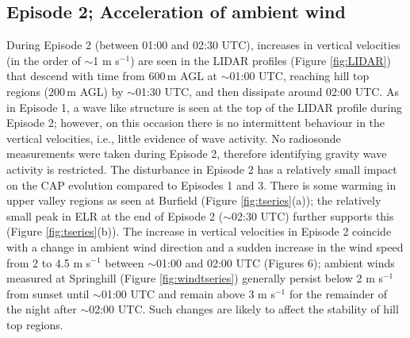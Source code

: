 \documentclass[times]{qjrms4}
\begin{document}
\subsection{Episode 2; Acceleration of ambient wind}
\label{ep2}
During Episode 2 (between 01:00 and 02:30 UTC), increases in vertical velocities (in the order of $\sim$1 m s$^{−1}$) are seen in the LIDAR profiles (Figure \ref{fig:LIDAR}) that descend with time from 600$\,\mbox{m}$ AGL at $\sim$01:00 UTC, reaching hill top regions (200$\,\mbox{m}$ AGL) by $\sim$01:30 UTC, and then dissipate around 02:00 UTC. As in Episode 1, a wave like structure is seen at the top of the LIDAR profile during Episode 2; however, on this occasion there is no intermittent behaviour in the vertical velocities, i.e., little evidence of wave activity. No radiosonde measurements were taken during Episode 2, therefore identifying gravity wave activity is restricted. The disturbance in Episode 2 has a relatively small impact on the CAP evolution compared to Episodes 1 and 3. There is some warming in upper valley regions as seen at Burfield (Figure \ref{fig:tseries}(a)); the relatively small peak in ELR at the end of Episode 2 ($\sim$02:30 UTC) further supports this (Figure \ref{fig:tseries}(b)). The increase in vertical velocities in Episode 2 coincide with a change in ambient wind direction and a sudden increase in the wind speed from 2 to 4.5 m s$^{-1}$ between $\sim$01:00 and 02:00 UTC (Figures 6); ambient winds measured at Springhill (Figure \ref{fig:windtseries}) generally persist below 2 m s$^{-1}$ from sunset until $\sim$01:00 UTC and remain above 3 m s$^{-1}$ for the remainder of the night after $\sim$02:00 UTC. Such changes are likely to affect the stability of hill top regions.
\end{document}
